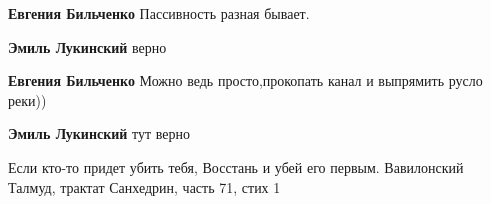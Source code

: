 \begin{itemize}
\begin{itemize}
 
\textbf{Евгения Бильченко} Пассивность разная бывает.

 
\textbf{Эмиль Лукинский} верно

 
\textbf{Евгения Бильченко} Можно ведь просто,прокопать канал и выпрямить русло реки))

 
\textbf{Эмиль Лукинский} тут верно
\end{itemize}

 

Если кто-то придет убить тебя, Восстань и убей его первым. Вавилонский Талмуд,
трактат Санхедрин, часть 71, стих 1

\end{itemize}


